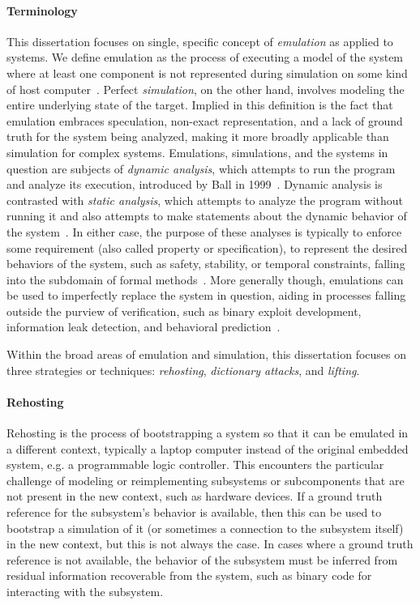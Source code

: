\paragraph{Terminology}
This dissertation focuses on single, specific concept of \emph{emulation} as applied to systems.
We define emulation as the process of executing a model of the system where at least one component is not represented during simulation on some kind of host computer~\cite{marwedel2021embedded}.
Perfect \emph{simulation}, on the other hand, involves modeling the entire underlying state of the target.
Implied in this definition is the fact that emulation embraces speculation, non-exact representation, and a lack of ground truth for the system being analyzed, making it more broadly applicable than simulation for complex systems.
Emulations, simulations, and the systems in question are subjects of \emph{dynamic analysis}, which attempts to run the program and analyze its execution, introduced by Ball in 1999~\cite{ball1999concept}.
Dynamic analysis is contrasted with \emph{static analysis}, which attempts to analyze the program without running it and also attempts to make statements about the dynamic behavior of the system~\cite{chess2004static}.
In either case, the purpose of these analyses is typically to enforce some requirement (also called property or specification), to represent the desired behaviors of the system, such as safety, stability, or temporal constraints, falling into the subdomain of formal methods~\cite{woodcock2009formal, leeb2005proving}.
More generally though, emulations can be used to imperfectly replace the system in question, aiding in processes falling outside the purview of verification, such as binary exploit development, information leak detection, and behavioral prediction~\cite{huang2014software, le2018micro, landsiedel2005accurate}.

Within the broad areas of emulation and simulation, this dissertation focuses on three strategies or techniques: \emph{rehosting}, \emph{dictionary attacks}, and \emph{lifting}.

\paragraph{Rehosting}
Rehosting is the process of bootstrapping a system so that it can be emulated in a different context, typically a laptop computer instead of the original embedded system, e.g. a programmable logic controller.
This encounters the particular challenge of modeling or reimplementing subsystems or subcomponents that are not present in the new context, such as hardware devices.
If a ground truth reference for the subsystem's behavior is available, then this can be used to bootstrap a simulation of it (or sometimes a connection to the subsystem itself) in the new context, but this is not always the case.
In cases where a ground truth reference is not available, the behavior of the subsystem must be inferred from residual information recoverable from the system, such as binary code for interacting with the subsystem.

